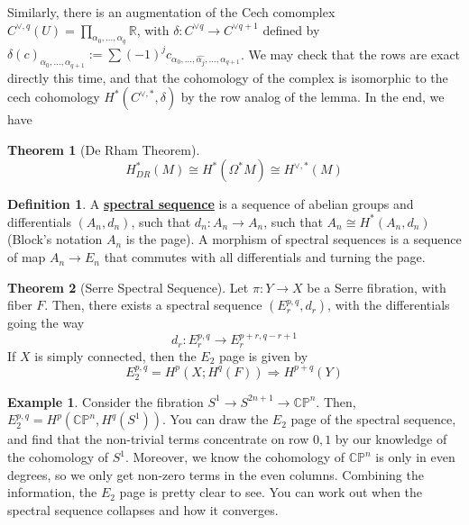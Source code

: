 \documentclass{article}
\theoremstyle{definition}
\newtheorem{theorem}{Theorem}[section]
\theoremstyle{definition}
\newtheorem{definition}{Definition}[theorem]
\theoremstyle{definition}
\theoremstyle{definition}
\theoremstyle{definition}
\theoremstyle{definition}
\theoremstyle{definition}
\newtheorem{example}{Example}[theorem]
\begin{document}
Similarly, there is an augmentation of the Cech comomplex $C^{\vee,q}(U)=\prod_{\alpha_0,...,\alpha_q} \mathbb{R}$, with $\delta: C^{\vee q}\to C^{\vee q+1}$ defined by $\delta(c)_{\alpha_0,...,\alpha_{q+1}}:=\sum(-1)^jc_{\alpha_0,...,\widehat{\alpha_j},...,\alpha_{q+1}}$. We may check that the rows are exact directly this time, and that the cohomology of the complex is isomorphic to the cech cohomology $H^*(C^{\vee,*},\delta)$ by the row analog of the lemma. In the end, we have 


\begin{tcolorbox}[colback=red!5!white,colframe=red!30!white]
\begin{theorem}[De Rham Theorem]
\[H^{*}_{DR}(M)\cong H^*(\Omega^*M)\cong H^{\vee,*}(M)\]
\end{theorem}
\end{tcolorbox}



\begin{tcolorbox}[colback=purple!5!white,colframe=purple!75!black]
\begin{definition}
A \underline{\textbf{spectral sequence}} is a sequence of abelian groups and differentials $(A_n,d_n)$, such that $d_n: A_n\to A_n$, such that $A_n\cong H^*(A_n,d_n)$ (Block's notation $A_n$ is the page). A morphism of spectral sequences is a sequence of map $A_n\to E_n$ that commutes with all differentials and turning the page.
\end{definition}
\end{tcolorbox}


\begin{tcolorbox}[colback=red!5!white,colframe=red!30!white]
\begin{theorem}[Serre Spectral Sequence]
Let $\pi: Y\to X$ be a Serre fibration, with fiber $F$. Then, there exists a spectral sequence $(E_r^{p,q},d_r)$, with the differentials going the way 
\[d_r: E_r^{p,q}\to E_r^{p+r,q-r+1}\]
If $X$ is simply connected, then the $E_2$ page is given by 
\[E_2^{p,q}=H^{p}(X; H^q(F))\Rightarrow H^{p+q}(Y)\]
\end{theorem}
\end{tcolorbox}


\begin{tcolorbox}[colback=yellow!5!white,colframe=yellow!30!white]
\begin{example}
Consider the fibration $S^1\to S^{2n+1}\to \mathbb{CP}^n$. Then, $E_2^{p,q}=H^p(\mathbb{CP}^n,H^q(S^1))$. You can draw the $E_2$ page of the spectral sequence, and find that the non-trivial terms concentrate on row $0,1$ by our knowledge of the cohomology of $S^1$. Moreover, we know the cohomology of $\mathbb{CP}^n$ is only in even degrees, so we only get non-zero terms in the even columns. Combining the information, the $E_2$ page is pretty clear to see. You can work out when the spectral sequence collapses and how it converges.  
\end{example}
\end{tcolorbox}
\end{document}
